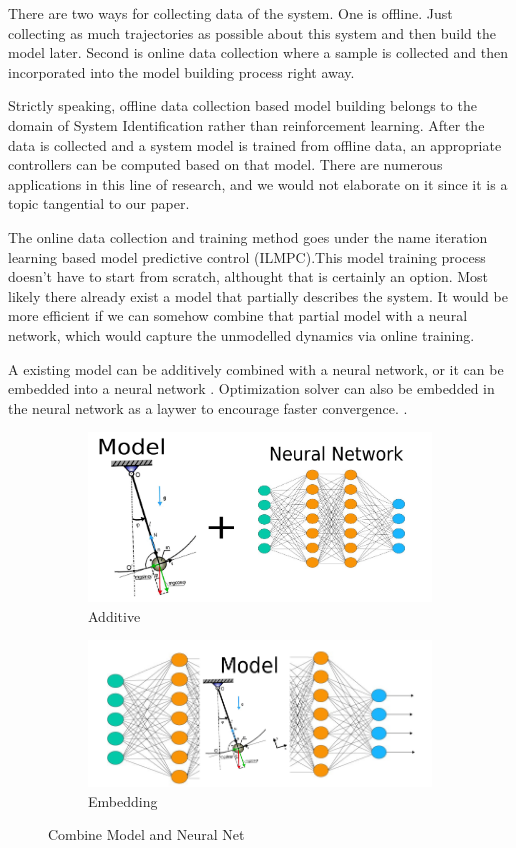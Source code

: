 \documentclass[journal]{IEEEtran}
\begin{document}
There are two ways for collecting data of the system. One is offline. Just collecting as much trajectories as possible about this system and then build the model later. Second is online data collection where a sample is collected and then incorporated into the model building process right away.

Strictly speaking, offline data collection based model building belongs to the domain of System Identification rather than reinforcement learning. After the data is collected and a system model is trained from offline data, an appropriate controllers can be computed based on that model. There are numerous applications in this line of research, and we would not elaborate on it since it is a topic tangential to our paper.

The online data collection and training method goes under the name iteration learning based model predictive control (ILMPC).This model training process doesn't have to start from scratch, althought that is certainly an option. Most likely there already exist a model that partially describes the system. It would be more efficient if we can somehow combine that partial model with a neural network, which would capture the unmodelled dynamics via online training.

A existing model can be additively combined \cite{Hewing2020LearningBasedMP} with a neural network, or it can be embedded into a neural network \cite{Mohan2020EmbeddingHP}. Optimization solver can also be embedded in the neural network as a laywer to encourage faster convergence. \cite{BelbutePeres2018EndtoEndDP} \cite{BelbutePeres2020CombiningDP} \cite{Agrawal2019DifferentiableCO}.

\begin{figure}
\centering
\begin{subfigure}{0.5\textwidth}
  \centering
  \includegraphics[width=.4\linewidth]{combine1.png}
  \caption{Additive}
\end{subfigure}%
\begin{subfigure}{.5\textwidth}
  \centering
  \includegraphics[width=.4\linewidth]{combine2.png}
  \caption{Embedding}
\end{subfigure}
\caption{Combine Model and Neural Net}
\end{figure}
\end{document}
